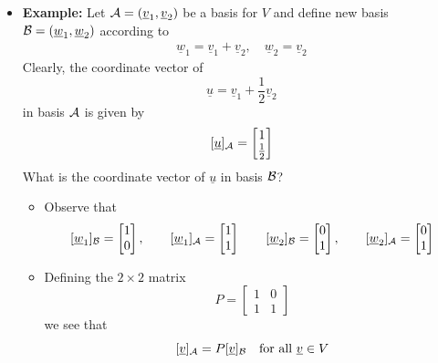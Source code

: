 \documentclass[11pt,twoside]{report}
\newcommand{\vecnot}{\underline}
\begin{document}
\begin{itemize}
\item \textbf{Example:}  Let $\cA = (\vecnot{v}_1, \vecnot{v}_2)$ be a basis for $V$ and  define new basis $\cB = (\vecnot{w}_1, \vecnot{w}_2)$ according to 
\begin{align*}
\vecnot{w}_1 = \vecnot{v}_1+ \vecnot{v}_2, \quad \vecnot{w}_2 = \vecnot{v}_2
\end{align*}
Clearly, the coordinate vector of 
\[
\vecnot{u}= \vecnot{v}_1+  \frac{1}{2} \vecnot{v}_2%
\]
in basis $\mathcal{A}$ is given by 
\[
 [\vecnot{u}]_{\cA} = \begin{bmatrix} 1 \\  \tfrac{1}{2} \end{bmatrix} 
 \]
 What is the coordinate vector of $\vecnot{u}$ in basis $\mathcal{B}$?


\begin{itemize}
\item Observe that
\[
 [\vecnot{w}_1]_{\cB}  = \begin{bmatrix} 1 \\  0 \end{bmatrix} , \qquad   [\vecnot{w}_1]_{\cA}  = \begin{bmatrix} 1 \\  1 \end{bmatrix}  \qquad   [\vecnot{w}_2]_{\cB}  = \begin{bmatrix} 0 \\  1 \end{bmatrix} , \qquad   [\vecnot{w}_2]_{\cA}  = \begin{bmatrix} 0  \\  1 \end{bmatrix}  
\]
\item Defining the $2 \times 2$ matrix 
\[
P = \begin{bmatrix} 1 & 0 \\ 1 & 1 \end{bmatrix}  
\]
we see that
\[
 [\vecnot{v}]_{\cA}  = P [\vecnot{v}]_{\cB}  \quad \text{for all $\vecnot{v} \in V$}
\]


\end{itemize}
\end{itemize}
\end{document}
